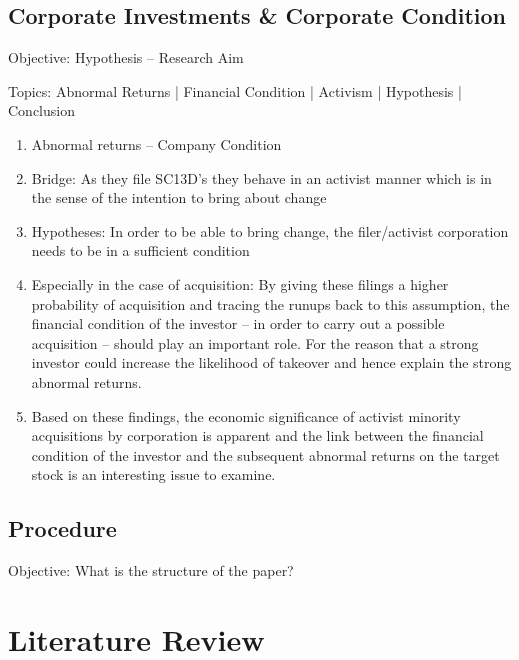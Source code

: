 \documentclass[12pt]{article}
\begin{document}
\subsection{Corporate Investments \& Corporate Condition}
\begin{center}
Objective: Hypothesis -- Research Aim 
\end{center}
Topics: Abnormal Returns | Financial Condition | Activism | Hypothesis | Conclusion
    \begin{enumerate}
        \item Abnormal returns -- Company Condition 
        \item Bridge: As they file SC13D's they behave in an activist manner which is in the sense of \citet{Klein2009} the intention to bring about change
        \item Hypotheses: In order to be able to bring change, the filer/activist corporation needs to be in a sufficient condition 
    
        \item Especially in the case of acquisition: By giving these filings a higher probability of acquisition and tracing the runups back to this assumption, the financial condition of the investor -- in order to carry out a possible acquisition -- should play an important role. For the reason that a strong investor could increase the likelihood of takeover and hence explain the strong abnormal returns.

        \item Based on these findings, the economic significance of activist minority acquisitions by corporation is apparent and the link between the financial condition of the investor and the subsequent abnormal returns on the target stock is an interesting issue to examine. 
    \end{enumerate}

\subsection{Procedure}
\begin{center}
Objective: What is the structure of the paper?
\end{center}

   



\section{Literature Review}
\end{document}
